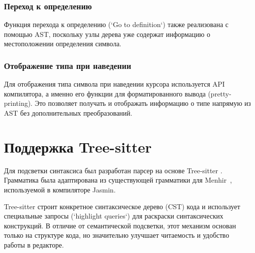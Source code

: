 \subsubsection*{Переход к определению}
Функция перехода к определению (`Go to definition`) также реализована с помощью
AST, поскольку узлы дерева уже содержат информацию о местоположении определения
символа.

\subsubsection*{Отображение типа при наведении} 

Для отображения типа символа при наведении курсора используется API компилятора,
а именно его функции для форматированного вывода (pretty-printing). Это
позволяет получать и отображать информацию о типе напрямую из AST без
дополнительных преобразований.

\section{Поддержка Tree-sitter}

\label{impl:tree-sitter}

Для подсветки синтаксиса был разработан парсер на основе Tree-sitter
\cite{tree-sitter}. Грамматика была адаптирована из существующей грамматики для
Menhir~\cite{menhir}, используемой в компиляторе Jasmin.

Tree-sitter строит конкретное синтаксическое дерево (CST) кода и использует
специальные запросы (`highlight queries`) для раскраски синтаксических
конструкций. В отличие от семантической подсветки, этот механизм основан только
на структуре кода, но значительно улучшает читаемость и удобство работы в
редакторе.